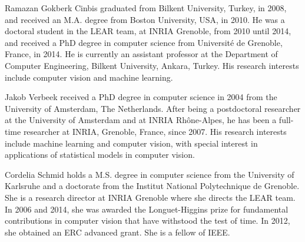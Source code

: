 \documentclass[10pt,journal,cspaper,final,twocolumn,compsoc]{./IEEEtran}
\begin{document}
\vspace{-5.5mm}
\begin{IEEEbiography}{Ramazan Gokberk Cinbis}
graduated from Bilkent University, Turkey, in 2008, and
received an M.A. degree from Boston University, USA, in 2010.
He was
a doctoral student in the LEAR team, at INRIA Grenoble,
from 2010 until 2014, and received a PhD degree in
computer science from Universit\'{e} de Grenoble, France,
in 2014. 
He is currently an assistant professor at the Department of Computer Engineering, Bilkent University, Ankara, Turkey. 
His research interests include computer vision and machine learning.  
\end{IEEEbiography}\vspace{-3.5mm}\begin{IEEEbiography}{Jakob Verbeek}
received a PhD degree in computer science in 2004 from the University of Amsterdam, The Netherlands. 
After being a postdoctoral researcher at the University of Amsterdam and at INRIA Rh\^one-Alpes, he has
been a full-time researcher  at INRIA, Grenoble, France, since 2007. 
His research interests include machine learning and computer vision, with special interest in applications of
statistical models in computer vision. 
\end{IEEEbiography}\vspace{-3.5mm}\begin{IEEEbiography}{Cordelia Schmid}
holds a M.S. degree in computer science
from the University of Karlsruhe and a doctorate from the
Institut National Polytechnique de Grenoble. She is a
research director at INRIA Grenoble where she directs the
LEAR team. In 2006 and 2014, she was awarded the Longuet-Higgins
prize for fundamental contributions in computer vision
that have withstood the test of time. In 2012, she
obtained an ERC advanced grant. She is a fellow of IEEE.
\end{IEEEbiography}
\end{document}
